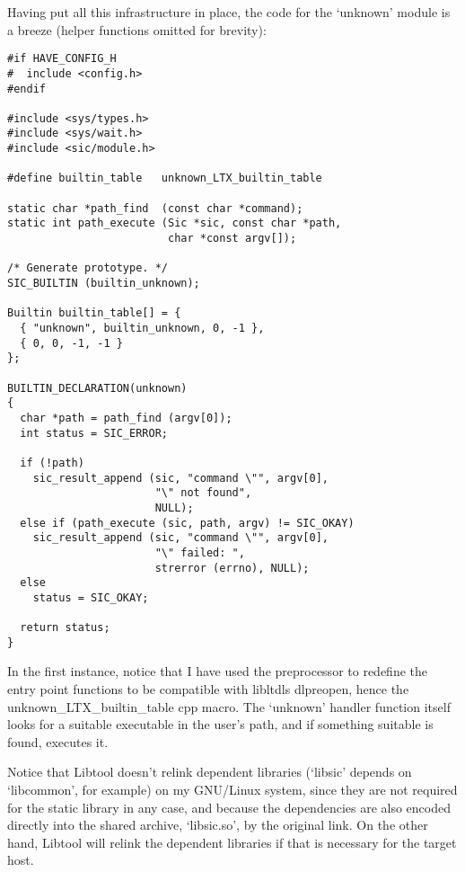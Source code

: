 Having put all this infrastructure in place, the code for the `unknown' module is a breeze (helper functions omitted for brevity):

 	
\begin{Verbatim}[frame=single]
#if HAVE_CONFIG_H
#  include <config.h>
#endif

#include <sys/types.h>
#include <sys/wait.h>
#include <sic/module.h>

#define builtin_table   unknown_LTX_builtin_table

static char *path_find  (const char *command);
static int path_execute (Sic *sic, const char *path,
                         char *const argv[]);

/* Generate prototype. */
SIC_BUILTIN (builtin_unknown);

Builtin builtin_table[] = {
  { "unknown", builtin_unknown, 0, -1 },
  { 0, 0, -1, -1 }
};

BUILTIN_DECLARATION(unknown)
{
  char *path = path_find (argv[0]);
  int status = SIC_ERROR;

  if (!path)
    sic_result_append (sic, "command \"", argv[0],
                       "\" not found",
                       NULL);
  else if (path_execute (sic, path, argv) != SIC_OKAY)
    sic_result_append (sic, "command \"", argv[0],
                       "\" failed: ",
                       strerror (errno), NULL);
  else
    status = SIC_OKAY;

  return status;
}
\end{Verbatim}
In the first instance, notice that I have used the preprocessor to redefine the entry point functions to be compatible with libltdls dlpreopen, hence the unknown\_{}LTX\_{}builtin\_{}table cpp macro. The `unknown' handler function itself looks for a suitable executable in the user's path, and if something suitable is found, executes it.

Notice that Libtool doesn't relink dependent libraries (`libsic' depends on `libcommon', for example) on my GNU/Linux system, since they are not required for the static library in any case, and because the dependencies are also encoded directly into the shared archive, `libsic.so', by the original link. On the other hand, Libtool will relink the dependent libraries if that is necessary for the target host. 
 	
